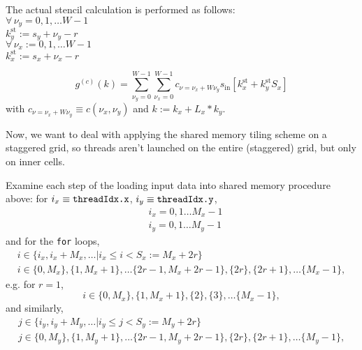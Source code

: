 \documentclass[10pt]{amsart}
\begin{document}
\begin{multicols*}{2}
The actual stencil calculation is performed as follows: \\
$\forall \, \nu_y = 0,1,\dots W-1 $\\ 
\phantom{$\forall \, $ \qquad \, } $k_y^{\text{st}} := s_y + \nu_y - r $ \\ 
\phantom{$\forall \, $ \qquad \, } $\forall \, \nu_x := 0,1,\dots W-1 $ \\ 
\phantom{$\forall \, $ \qquad \qquad \, \, } $k_x^{\text{st}} := s_x + \nu_x- r $

\begin{equation}
	g^{(c)}(k) = \sum_{\nu_y=0}^{W-1} \sum_{\nu_x=0}^{W-1} c_{\nu =\nu_x +W\nu_y} s_{\text{in}}[k_x^{\text{st}} + k_y^{\text{st}}S_x]
\end{equation}
with $c_{\nu = \nu_x+W\nu_y} \equiv c(\nu_x,\nu_y)$ and $k:= k_x + L_x*k_y$.

  Now, we want to deal with applying the shared memory tiling scheme on a staggered grid, so threads aren't launched on the entire (staggered) grid, but only on inner cells.  

Examine each step of the loading input data into shared memory procedure above: for $i_x \equiv \verb|threadIdx.x|$, $i_y \equiv \verb|threadIdx.y|$, 
\[
\begin{aligned}
	& i_x = 0 ,1\dots M_x -1 \\ 
	& i_y = 0,1 \dots M_y-1
\end{aligned}
\]
and for the \verb|for| loops, 
\[
\begin{gathered}
i\in \lbrace i_x,i_x+M_x,\dots | i_x\leq i < S_x := M_x +2r \rbrace \\
i\in \lbrace 0,M_x\rbrace, \lbrace 1,M_x+1 \rbrace, \dots \lbrace 2r-1, M_x+2r-1\rbrace , \lbrace 2r \rbrace, \lbrace 2r +1 \rbrace, \dots \lbrace M_x -1  \rbrace, 
\end{gathered}
\]
e.g. for $r=1$, 
\[
i\in \lbrace 0 , M_x \rbrace, \lbrace 1, M_x +1 \rbrace, \lbrace 2 \rbrace, \lbrace 3 \rbrace, \dots  \lbrace M_x-1 \rbrace, 
\]
and similarly, 
\[
\begin{gathered}
j \in \lbrace i_y,i_y+M_y,\dots | i_y\leq j < S_y := M_y +2r \rbrace \\
j\in \lbrace 0,M_y\rbrace, \lbrace 1,M_y+1 \rbrace, \dots \lbrace 2r-1, M_y+2r-1\rbrace , \lbrace 2r \rbrace, \lbrace 2r +1 \rbrace, \dots \lbrace M_y -1  \rbrace, 
\end{gathered}
\]


\end{multicols*}
\end{document}
